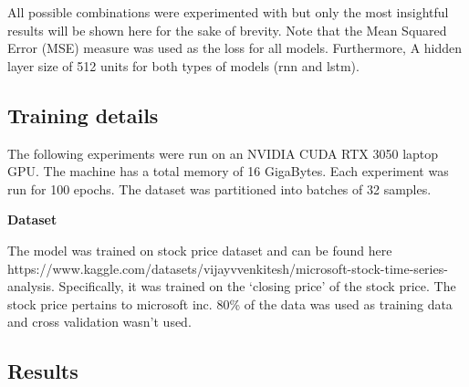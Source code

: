\documentclass[12pt, letterpaper]{article}
\begin{document}
All possible combinations were experimented with but only the most insightful results will be shown here
for the sake of brevity. Note that the Mean Squared Error (MSE) measure was 
used as the loss for all models. Furthermore, A hidden layer 
size of 512 units for both types of models (rnn and lstm).

\subsection{Training details}

The following experiments were run on an NVIDIA CUDA RTX 3050 laptop GPU. The
machine has a total memory of 16 GigaBytes. Each experiment was run for 100 epochs.
The dataset was partitioned into batches of 32 samples. 

\textbf{Dataset}

The model was trained on stock price dataset and can be found here 
https://www.kaggle.com/datasets/vijayvvenkitesh/microsoft-stock-time-series-analysis.
Specifically, it was trained on the `closing price' of the stock price. The stock 
price pertains to microsoft inc. 80\% of the data was used as training data and 
cross validation wasn't used.

\subsection{Results}
\end{document}
